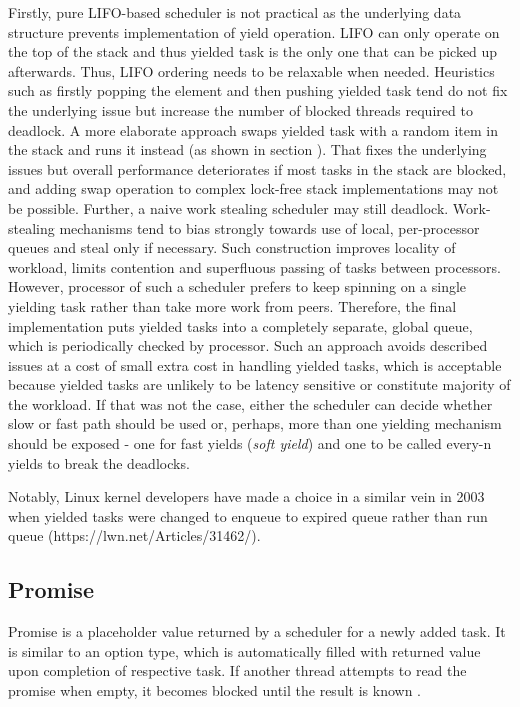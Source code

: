\documentclass[12pt,a4paper,twoside]{report}
\begin{document}
Firstly, pure LIFO-based scheduler is not practical as the underlying data structure prevents implementation of yield operation. LIFO can only operate on the top of the stack and thus yielded task is the only one that can be picked up afterwards. Thus, LIFO ordering needs to be relaxable when needed. Heuristics such as firstly popping the element and then pushing yielded task tend do not fix the underlying issue but increase the number of blocked threads required to deadlock. A more elaborate approach swaps yielded task with a random item in the stack and runs it instead (as shown in section ). That fixes the underlying issues but overall performance deteriorates if most tasks in the stack are blocked, and adding swap operation to complex lock-free stack implementations may not be possible. Further, a naive work stealing scheduler may still deadlock. Work-stealing mechanisms tend to bias strongly towards use of local, per-processor queues and steal only if necessary. Such construction improves locality of workload, limits contention and superfluous passing of tasks between processors. However, processor of such a scheduler prefers to keep spinning on a single yielding task rather than take more work from peers. Therefore, the final implementation puts yielded tasks into a completely separate, global queue, which is periodically checked by processor. Such an approach avoids described issues at a cost of small extra cost in handling yielded tasks, which is acceptable because yielded tasks are unlikely to be latency sensitive or constitute majority of the workload. If that was not the case, either the scheduler can decide whether slow or fast path should be used or, perhaps, more than one yielding mechanism should be exposed - one for fast yields (\textit{soft yield}) and one to be called every-n yields to break the deadlocks. 

Notably, Linux kernel developers have made a choice in a similar vein in 2003 when yielded tasks were changed to enqueue to expired queue rather than run queue  (https://lwn.net/Articles/31462/). 


\subsection{Promise}
\label{section:promise}
Promise is a placeholder value returned by a scheduler for a newly added task. It is similar to an option type, which is automatically filled with returned value upon completion of respective task. If another thread attempts to read the promise when empty, it becomes blocked until the result is known \cite{Swalens2014}. 
\end{document}
